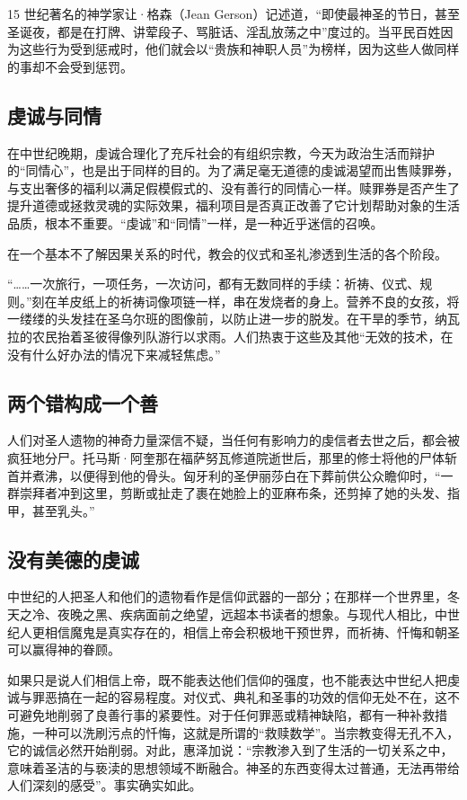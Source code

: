 15 世纪著名的神学家让·格森（Jean Gerson）记述道，“即使最神圣的节日，甚至圣诞夜，都是在打牌、讲荤段子、骂脏话、淫乱放荡之中”度过的。当平民百姓因为这些行为受到惩戒时，他们就会以“贵族和神职人员”为榜样，因为这些人做同样的事却不会受到惩罚。

\subsection{虔诚与同情}
在中世纪晚期，虔诚合理化了充斥社会的有组织宗教，今天为政治生活而辩护的“同情心”，也是出于同样的目的。为了满足毫无道德的虔诚渴望而出售赎罪券，与支出奢侈的福利以满足假模假式的、没有善行的同情心一样。赎罪券是否产生了提升道德或拯救灵魂的实际效果，福利项目是否真正改善了它计划帮助对象的生活品质，根本不重要。“虔诚”和“同情”一样，是一种近乎迷信的召唤。

在一个基本不了解因果关系的时代，教会的仪式和圣礼渗透到生活的各个阶段。

“……一次旅行，一项任务，一次访问，都有无数同样的手续：祈祷、仪式、规则。”刻在羊皮纸上的祈祷词像项链一样，串在发烧者的身上。营养不良的女孩，将一缕缕的头发挂在圣乌尔班的图像前，以防止进一步的脱发。在干旱的季节，纳瓦拉的农民抬着圣彼得像列队游行以求雨。人们热衷于这些及其他“无效的技术，在没有什么好办法的情况下来减轻焦虑。”

\subsection{两个错构成一个善}
人们对圣人遗物的神奇力量深信不疑，当任何有影响力的虔信者去世之后，都会被疯狂地分尸。托马斯·阿奎那在福萨努瓦修道院逝世后，那里的修士将他的尸体斩首并煮沸，以便得到他的骨头。匈牙利的圣伊丽莎白在下葬前供公众瞻仰时，“一群崇拜者冲到这里，剪断或扯走了裹在她脸上的亚麻布条，还剪掉了她的头发、指甲，甚至乳头。”

\subsection{没有美德的虔诚}
中世纪的人把圣人和他们的遗物看作是信仰武器的一部分；在那样一个世界里，冬天之冷、夜晚之黑、疾病面前之绝望，远超本书读者的想象。与现代人相比，中世纪人更相信魔鬼是真实存在的，相信上帝会积极地干预世界，而祈祷、忏悔和朝圣可以赢得神的眷顾。

如果只是说人们相信上帝，既不能表达他们信仰的强度，也不能表达中世纪人把虔诚与罪恶搞在一起的容易程度。对仪式、典礼和圣事的功效的信仰无处不在，这不可避免地削弱了良善行事的紧要性。对于任何罪恶或精神缺陷，都有一种补救措施，一种可以洗刷污点的忏悔，这就是所谓的“救赎数学”。当宗教变得无孔不入，它的诚信必然开始削弱。对此，惠泽加说：“宗教渗入到了生活的一切关系之中，意味着圣洁的与亵渎的思想领域不断融合。神圣的东西变得太过普通，无法再带给人们深刻的感受”。事实确实如此。

